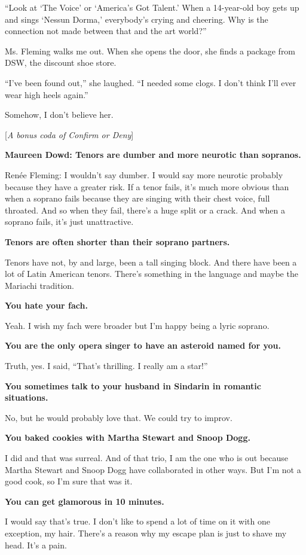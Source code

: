 ``Look at `The Voice' or `America's Got Talent.' When a 14-year-old boy
gets up and sings `Nessun Dorma,' everybody's crying and cheering. Why
is the connection not made between that and the art world?''

Ms. Fleming walks me out. When she opens the door, she finds a package
from DSW, the discount shoe store.

``I've been found out,'' she laughed. ``I needed some clogs. I don't
think I'll ever wear high heels again.''

Somehow, I don't believe her.

{[}\emph{A bonus coda of Confirm or Deny}{]}

\textbf{Maureen Dowd: Tenors are dumber and more neurotic than
sopranos.}

Renée Fleming: I wouldn't say dumber. I would say more neurotic probably
because they have a greater risk. If a tenor fails, it's much more
obvious than when a soprano fails because they are singing with their
chest voice, full throated. And so when they fail, there's a huge split
or a crack. And when a soprano fails, it's just unattractive.

\textbf{Tenors are often shorter than their soprano partners.}

Tenors have not, by and large, been a tall singing block. And there have
been a lot of Latin American tenors. There's something in the language
and maybe the Mariachi tradition.

\textbf{You hate your fach.}

Yeah. I wish my fach were broader but I'm happy being a lyric soprano.

\textbf{You are the only opera singer to have an asteroid named for
you.}

Truth, yes. I said, ``That's thrilling. I really am a star!''

\textbf{You sometimes talk to your husband in Sindarin in romantic
situations.}

No, but he would probably love that. We could try to improv.

\textbf{You baked cookies with Martha Stewart and Snoop Dogg.}

I did and that was surreal. And of that trio, I am the one who is out
because Martha Stewart and Snoop Dogg have collaborated in other ways.
But I'm not a good cook, so I'm sure that was it.

\textbf{You can get glamorous in 10 minutes.}

I would say that's true. I don't like to spend a lot of time on it with
one exception, my hair. There's a reason why my escape plan is just to
shave my head. It's a pain.

